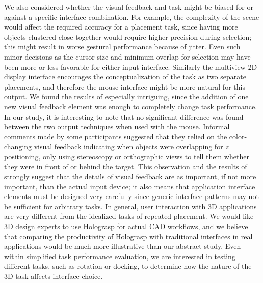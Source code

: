 \documentclass[pageno]{jpaper}
\begin{document}
We also
considered whether the visual feedback and task might be biased for or against a specific interface combination. For example, the
complexity of the scene would affect the required accuracy for a placement task, since having more objects clustered close together would require
higher precision during selection; this might result in worse gestural performance because of jitter. Even such minor decisions as the cursor size and minimum overlap
for selection may have been more or less favorable for either input interface. Similarly the multiview 2D display interface
encourages the conceptualization of the task as two separate placements, and therefore the mouse interface might be more natural for this output.
We found the results of \cite{study2} especially intriguing,
since the addition of one new visual feedback element was enough to completely change task performance. 
In our study, it is interesting to note that no significant difference was found between the two output techniques when used with the mouse. 
Informal comments made by some participants suggested
that they relied on the color-changing visual feedback indicating when objects were overlapping for $z$ positioning, only using stereoscopy or orthographic
views to tell them whether they were in front of or behind the target.
This observation and the results of \cite{study2} strongly suggest that the details
of visual feedback are as important, if not more important, than the actual input device; it also means that application interface elements must be
designed very carefully since generic interface patterns may not be sufficient for arbitrary tasks. In general, user interaction with 3D applications are very different from the idealized tasks
of repeated placement. We would like 3D design experts to use Holograsp for actual CAD workflows, and we believe that comparing the productivity of Holograsp with
traditional interfaces in real applications would be much more illustrative than our abstract study.
Even within simplified task performance evaluation, we are interested in testing different tasks, such as rotation or docking, to determine how the nature of the
3D task affects interface choice.
\end{document}
